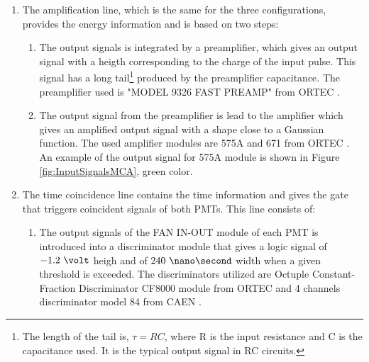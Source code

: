 \begin{enumerate}

\item{} The amplification line, which is the same for the three configurations, provides the energy information and is based on two steps:



\begin{enumerate}

\item{} The output signals is integrated by a preamplifier, which gives an output signal with a heigth corresponding to the charge of the input pulse. This signal has a long tail\footnote{The length of the tail is, $\tau=RC$, where R is the input resistance and C is the capacitance used. It is the typical output signal in RC circuits.} produced by the preamplifier capacitance. The preamplifier used is "MODEL 9326 FAST PREAMP" from ORTEC \cite{DataSheetPreAmp}.

\item{} The output signal from the preamplifier is lead to the amplifier which gives an amplified output signal with a shape close to a Gaussian function. The used  amplifier modules are 575A and 671 from ORTEC \cite{DataSheet575Amp, DataSheet671Amp}. An example of the output signal for 575A module is shown in Figure \ref{fig:InputSignalsMCA}, green color.

\end{enumerate}

\item{} The time coincidence line contains the time information and gives the gate that triggers coincident signals of both PMTs. This line consists of:

\begin{enumerate}

\item{} The output signals of the FAN IN-OUT module of each PMT is introduced into a discriminator module that gives a logic signal of $-1.2~\volt$ heigh and of $240~\nano\second$ width when a given threshold is exceeded. The discriminators utilized are  Octuple Constant-Fraction Discriminator CF8000 module from ORTEC \cite{DataSheetDiscriminator} and 4 channels discriminator model 84 from CAEN \cite{DataSheetDiscriminatorCAEN}.


\end{enumerate}
\end{enumerate}
